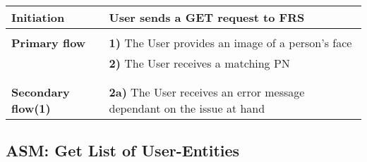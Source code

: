 \documentclass[a4paper,11pt]{article}
\begin{document}
\begin{tabular}{|p{3.5cm}|p{11.5cm}|}
    \textbf{Initiation} & User sends a GET request to FRS
        
    \\ \hline \rowcolor{Gray} & \\ \hline 
         
    \textbf{Primary flow} & 
    \textbf{1)} The User provides an image of a person's face \\&
    \textbf{2)} The User receives a matching PN \\&
        
    \\ \hline \rowcolor{Gray} & \\ \hline 
         
    \textbf{Secondary flow(1)} & 
    \textbf{2a)} The User receives an error message dependant on the issue at hand
    \\ \hline 
\end{tabular}

\subsection{ASM: Get List of User-Entities}
\end{document}
